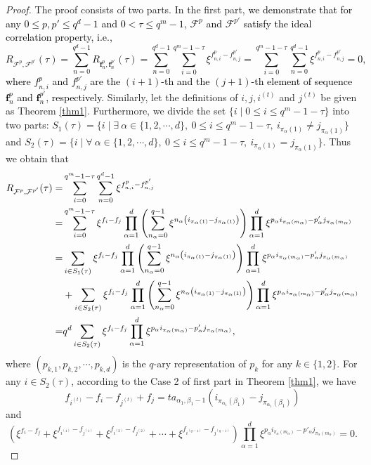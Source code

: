\documentclass[11pt]{article}
\newcommand{\2} {$2$-to-$1$}
\begin{document}
\begin{proof}
The proof consists of two parts. In the first part, \textcolor{black}{we demonstrate that  for any $ 0 \leq p, p'\leq q^d-1 $ and $0<\tau\leq q^m-1$, $\mathcal{F}^{p}$  and $\mathcal{F}^{p'}$ satisfy the ideal correlation property, i.e.,
	$$R_{\mathcal{F}^{p},\mathcal{F}^{p'}}(\tau)=\sum_{n=0}^{q^{d}-1}R_{\mathbf{f}^{p}_n,\mathbf{f}^{p'}_n}(\tau)=\sum_{n=0}^{q^{d}-1}\sum_{i=0}^{q^m-1-\tau}\xi^{f^{p}_{n,i}-f^{p'}_{n,j}}=\sum_{i=0}^{q^m-1-\tau}\sum_{n=0}^{q^{d}-1}\xi^{f^{p}_{n,i}-f^{p'}_{n,j}}=0, $$ where $ f^{p}_{n,i} $ and $ f^{p'}_{n,j} $ are the $ (i+1) $-th and the $ (j+1) $-th
	element of sequence $ \mathbf{f}^{p}_{n} $ and $ \mathbf{f}^{p'}_{n} $, respectively.}  Similarly, let the definitions of $i, j, i^{(t)} $ and $ j^{(t)} $  be given as Theorem \ref{thm1}. 	Furthermore, we divide the set $ \{i \mid 0\leq i\leq  q^m-1-\tau \}$ into two parts: $ S_1(\tau)=\{i\mid \exists\ \alpha\in \{1,2,\cdots,d\},\ 0\leq i\leq q^m-1-\tau,\ i_{\pi_{\alpha}(1)}\neq j_{\pi_{\alpha}(1)}\} $  and  $ S_2(\tau)=\{i\mid \forall\ \alpha\in \{1,2,\cdots,d\},\ 0\leq i\leq q^m-1-\tau,\ i_{\pi_{\alpha}(1)}= j_{\pi_{\alpha}(1)}\} $.
 Thus we obtain that
\begin{align*}
	R_{\mathcal{\textcolor{black}{F}}^{p},\mathcal{\textcolor{black}{F}}^{p'}}(\tau)=&\sum_{i=0}^{q^m-1-\tau}\sum_{n=0}^{q^{d}-1}\xi^{f^{p}_{n,i}-f^{p'}_{n,j}}\\
	=&\sum_{i=0}^{q^m-1-\tau}\xi^{f_i-f_j}\prod_{\alpha=1}^{d}\left( \sum_{n_{\alpha}=0}^{q-1}\xi^{n_{\alpha}\left( i_{\pi_{\alpha}(1)}- j_{\pi_{\alpha}(1)}\right) }\right)\prod_{\alpha=1}^{d}\xi^{p_{\alpha}i_{\pi_{\alpha}(m_{\alpha})}- p'_{\alpha}j_{\pi_{\alpha}(m_{\alpha})}}\\
	=&\sum_{i\in S_1(\tau)}\xi^{f_i-f_j}\prod_{\alpha=1}^{d}\left( \sum_{n_{\alpha}=0}^{q-1}\xi^{n_{\alpha}\left( i_{\pi_{\alpha}(1)}- j_{\pi_{\alpha}(1)}\right)}\right)\prod_{\alpha=1}^{d}\xi^{p_{\alpha}i_{\pi_{\alpha}(m_{\alpha})}- p'_{\alpha}j_{\pi_{\alpha}(m_{\alpha})}}\\&+\sum_{i\in S_2(\tau)}\xi^{f_i-f_j}\prod_{\alpha=1}^{d}\left( \sum_{n_{\alpha}=0}^{q-1}\xi^{n_{\alpha}\left( i_{\pi_{\alpha}(1)}- j_{\pi_{\alpha}(1)}\right)}\right)\prod_{\alpha=1}^{d}\xi^{p_{\alpha}i_{\pi_{\alpha}(m_{\alpha})}- p'_{\alpha}j_{\pi_{\alpha}(m_{\alpha})}}\\
	=&q^d\sum_{i\in S_2(\tau)}\xi^{f_i-f_j}\prod_{\alpha=1}^{d}\xi^{p_{\alpha}i_{\pi_{\alpha}(m_{\alpha})}- p'_{\alpha}j_{\pi_{\alpha}(m_{\alpha})}},
\end{align*}
where  $ (p_{k,1},p_{k,2},\cdots,p_{k,d})  $ is the $ q $-ary representation of $ p_k $ for any $ k\in \{1,2\}. $
For any $ i\in S_2(\tau) $, according to the Case 2 of first part in Theorem \ref{thm1}, we have
$$ f_{i^{(t)}}-f_i-f_{j^{(t)}}+f_j=ta_{\alpha_1,\beta_{1}-1}\left( i_{\pi_{\alpha_1}(\beta_{1})}- j_{\pi_{\alpha_1}(\beta_{1})}\right)  $$ and
$$ (\xi^{f_i-f_j}+\xi^{f_{i^{(1)}}-f_{j^{(1)}}}+\xi^{f_{i^{(2)}}-f_{j^{(2)}}}+\cdots+\xi^{f_{i^{(q-1)}}-f_{j^{(q-1)}}})\prod_{\alpha=1}^{d}\xi^{p_{\alpha}i_{\pi_{\alpha}(m_{\alpha})}- p'_{\alpha}j_{\pi_{\alpha}(m_{\alpha})}}=0. $$


\end{proof}
\end{document}
